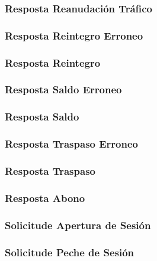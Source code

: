 \documentclass[a4paper,titlepage]{article}
\begin{document}
\subsubsection{Resposta Reanudación Tráfico}

\subsubsection{Resposta Reintegro Erroneo}

\subsubsection{Resposta Reintegro}

\subsubsection{Resposta Saldo Erroneo}

\subsubsection{Resposta Saldo}

\subsubsection{Resposta Traspaso Erroneo}

\subsubsection{Resposta Traspaso}

\subsubsection{Resposta Abono}

\subsubsection{Solicitude Apertura de Sesión}

\subsubsection{Solicitude Peche de Sesión}

\end{document}
